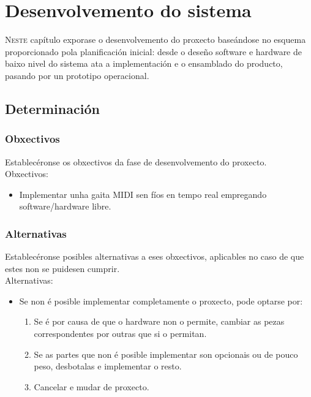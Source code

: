 \chapter{Desenvolvemento do sistema}
\minitoc
\label{chap:implementacion}
\vspace{0.5cm}


\lettrine{N}{este} capítulo exporase o desenvolvemento do proxecto baseándose
no esquema proporcionado pola planificación inicial: desde o deseño software e
hardware de baixo nivel do sistema ata a implementación e o ensamblado do
producto, pasando por un prototipo operacional.

\section{Determinación}

 \subsection{Obxectivos}

 Establecéronse os obxectivos da fase de desenvolvemento do proxecto. \\

 Obxectivos:

 \begin{itemize}
  \item Implementar unha gaita MIDI sen fíos en tempo real empregando
        software/hardware libre.
 \end{itemize}

 \subsection{Alternativas}

 Establecéronse posibles alternativas a eses obxectivos, aplicables no caso de
 que estes non se puidesen cumprir. \\

 Alternativas:

 \begin{itemize}
  \item Se non é posible implementar completamente o proxecto, pode optarse
        por:
        \begin{enumerate}
         \item Se é por causa de que o hardware non o permite, cambiar as pezas
               correspondentes por outras que si o permitan.
         \item Se as partes que non é posible implementar son opcionais ou de
               pouco peso, desbotalas e implementar o resto.
         \item Cancelar e mudar de proxecto.
        \end{enumerate}
 \end{itemize}

